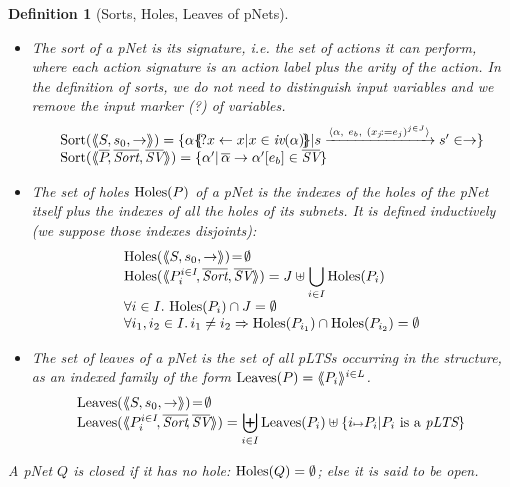 \documentclass{lmcs}
\newtheorem{definition}{Definition}
\begin{document}
\begin{definition}[Sorts, Holes, Leaves of pNets]\label{def-sortholeleave}~~

  \begin{itemize}
  \item The sort of a pNet is its signature, i.e. the set of actions it can
perform, where each action signature is an action 
label plus the arity of the action. In the definition of sorts, we do not need to 
distinguish
input variables and we remove the
\emph{input marker} (?) of variables.
\[
\begin{array}{l}
\Sortop(\mylangle S,s_0, \to\myrangle) = \{\alpha\subst{?x \gets x| 
x\in\symb{iv}(\alpha)}|s \xrightarrow{\langle \alpha,~e_b,~(x_j\!:= {e}_j)^{j\in
    J}\rangle} s'\in \to \} \\
\Sortop(\mylangle \set{\pNet}\!, %
\set{\Sort},
\set{\symb{SV}}\myrangle)
=\{\alpha' |\, \SV{\set{\alpha}}{\alpha'}{e_b}\in\set{\symb{SV}}\}
\end{array}
\]

\item
The set of holes $\operatorname{Holes}(P)$ of a pNet is the indexes of the holes of the pNet 
itself plus the indexes of all the holes of its subnets.
It is defined inductively (we suppose those indexes 
disjoints):
  \[\begin{array}{l}
\Holes(\mylangle S,s_0, \to\myrangle) \!=\! \emptyset\\
\Holes(\mylangle \pNet_i^{i\in I}\!,\set{\Sort}, \set{\symb{SV}}\myrangle) 
=J\uplus{\displaystyle \bigcup_{i\in 
I}\Holes(\pNet_i)}\\
\forall i\in I.\, \Holes(\pNet_i)\cap J=\emptyset\\
\forall i_1,i_2\in I.\,i_1\neq i_2\Rightarrow  \Holes(\pNet_{i_1})\cap\Holes(\pNet_{i_2})=\emptyset
\end{array}\]
\item
The set of leaves of a pNet is the set of all pLTSs occurring in the structure, as an 
indexed family of the form $\operatorname{Leaves}(P)= \langle\hspace{-0.58ex}\langle P_i \rangle\hspace{-0.58ex}\rangle^{i \in L}$.
\[\begin{array}{l}
\Leaves(\mylangle S,s_0, \to\myrangle) \!=\!\emptyset\\%
\Leaves(\mylangle \pNet_i^{i\in I}\!,%
\set{\Sort}\!, \set{\symb{SV}}\myrangle) = {\displaystyle \biguplus_{i\in 
I}\Leaves(\pNet_i)\uplus\{i\mapsto \pNet_i|\pNet_i \text{ is a }\pLTS\}}
\end{array}\]
\end{itemize}

A pNet $Q$ is \emph{closed} if it has no hole: $\operatorname{Holes}(Q)=\emptyset$; else it
is said to be \emph{open}.
\end{definition}
  
\end{document}
